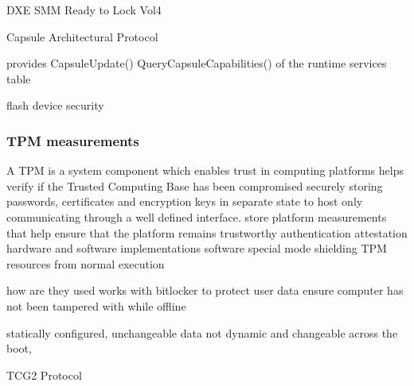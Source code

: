 
DXE SMM Ready to Lock Vol4

Capsule Architectural Protocol

provides
CapsuleUpdate()
QueryCapsuleCapabilities()
of the runtime services table

flash device security

\subsubsection{TPM measurements}

A \acf{TPM} is a system component which enables trust in computing platforms
helps verify if the Trusted Computing Base has been compromised
securely storing passwords, certificates and encryption keys in separate state to host
only communicating through a well defined interface.
store platform measurements that help ensure that the platform remains trustworthy
authentication
attestation
hardware and software implementations
software special mode shielding TPM resources from normal execution
\cite{tcg-tpm-summary}
\cite{tcg-tpm-library-part1-architecture}

how are they used
works with bitlocker to protect user data
ensure computer has not been tampered with while offline

statically configured, unchangeable data
not dynamic and changeable across the boot,
\cite{tianocore-trusted-boot-chain}

\cite{tianocore-trusted-boot-chain}

TCG2 Protocol
\cite{tcg-efi-protocol}

